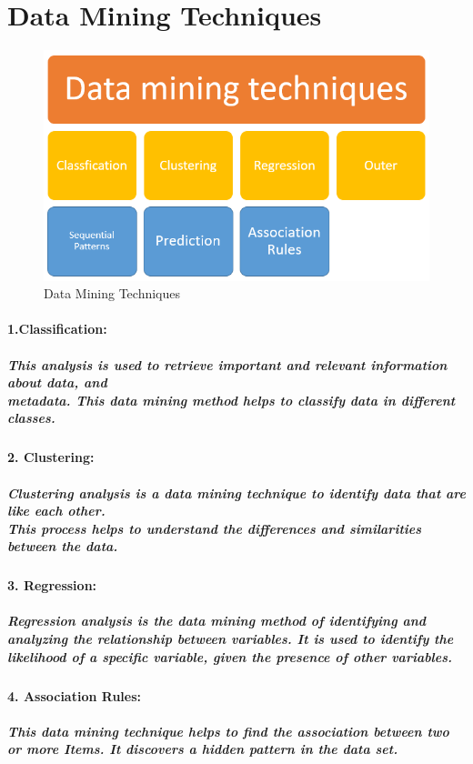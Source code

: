 \documentclass{article}
\begin{document}
\section{Data Mining Techniques}
\begin{figure}[H]
\centering
\includegraphics[height=2.35in•]{data_mining_1.png}
\caption{Data Mining Techniques}

\end{figure}
\paragraph*{1.Classification:}
\subparagraph{This analysis is used to retrieve important and relevant information about data, and\\metadata. This data mining method helps to classify data in different classes.}
\paragraph*{2. Clustering:}
\subparagraph{Clustering analysis is a data mining technique to identify data that are like each other.\\This process helps to understand the differences and similarities between the data.}
\paragraph{3. Regression:}
\subparagraph{Regression analysis is the data mining method of identifying and analyzing the relationship between variables. It is used to identify the likelihood of a specific variable, given the presence of other variables.}
\paragraph*{4. Association Rules:}
\subparagraph{This data mining technique helps to find the association between two or more Items. It discovers a hidden pattern in the data set.}
\end{document}
